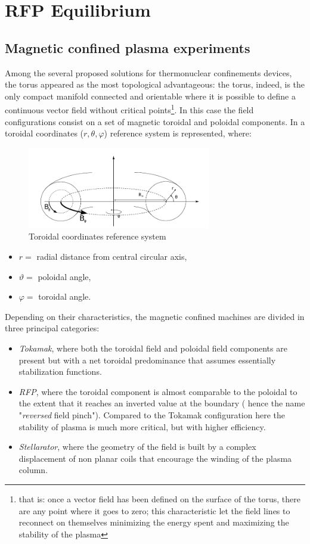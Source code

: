 \chapter{RFP Equilibrium}

\section{Magnetic confined plasma experiments}

Among the several proposed solutions for thermonuclear confinements devices, the torus appeared as the most topological advantageous: the torus, indeed, is the only compact manifold connected and orientable where it is possible to define a continuous vector field without critical points\footnote{that is: once a vector field has been defined on the surface of the torus, there are any point where it goes to zero; this characteristic let the field lines to reconnect on themselves minimizing the energy spent and maximizing the stability of the plasma}.
In this case the field configurations consist on a set of magnetic toroidal and poloidal components. In \Figure{\ref{fig:intro_toroidal_coords}} a toroidal coordinates ($r,\theta,\varphi$) reference system is represented, where:
\begin{figure}[h!]
    \centering
    \includegraphics[width=8cm]{img/1_intro/toroidal_coords.png}
    \caption{Toroidal coordinates reference system}
    \label{fig:intro_toroidal_coords}
\end{figure}
\begin{itemize}
    \item $r = $ radial distance from central circular axis,
    \item $\vartheta = $ poloidal angle,
    \item $\varphi = $ toroidal angle.
\end{itemize}
Depending on their characteristics, the magnetic confined machines are divided in three principal categories:
\begin{itemize}
    \item \textit{Tokamak}, where both the toroidal field and poloidal field components are present but with a net toroidal predominance that assumes essentially stabilization functions.
    \item \textit{RFP}, where the toroidal component is almost comparable to the poloidal to the extent that it reaches an inverted value at the boundary ( hence the name "\textit{reversed} field pinch"). Compared to the Tokamak configuration here the stability of plasma is much more critical, but with higher efficiency.
    \item \textit{Stellarator}, where the geometry of the field is built by a complex displacement of non planar coils that encourage the winding of the plasma column.
\end{itemize}

